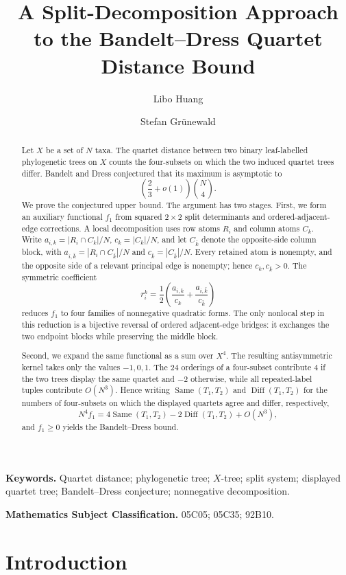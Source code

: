 \documentclass[11pt]{article}
\title{A Split-Decomposition Approach to the Bandelt--Dress Quartet Distance Bound}
\author{Libo Huang \and Stefan Gr\"unewald}
\date{}
\newcommand{\Same}{\operatorname{Same}}
\newcommand{\Diff}{\operatorname{Diff}}
\begin{document}
\maketitle


\begin{abstract}
Let $X$ be a set of $N$ taxa.  The quartet distance between two binary
leaf-labelled phylogenetic trees on $X$ counts the four-subsets on which the
two induced quartet trees differ.  Bandelt and Dress conjectured that its
maximum is asymptotic to
\[
\left(\frac23+o(1)\right)\binom N4.
\]
We prove the conjectured upper bound.  The argument has two stages.  First,
we form an auxiliary functional $f_1$ from squared $2\times2$ split
determinants and ordered-adjacent-edge corrections.  A local decomposition
uses row atoms $R_i$ and column atoms $C_k$.  Write
$a_{i,k}=|R_i\cap C_k|/N$, $c_k=|C_k|/N$, and let $C_{\bar k}$ denote the
opposite-side column block, with
$a_{i,\bar k}=|R_i\cap C_{\bar k}|/N$ and
$c_{\bar k}=|C_{\bar k}|/N$.  Every retained atom is nonempty, and the
opposite side of a relevant principal edge is nonempty; hence
$c_k,c_{\bar k}>0$.  The symmetric coefficient
\[
r_i^k=\frac12\left(\frac{a_{i,k}}{c_k}+\frac{a_{i,\bar k}}{c_{\bar k}}\right)
\]
reduces $f_1$ to four families of nonnegative quadratic forms.  The only
nonlocal step in this reduction is a bijective reversal of ordered
adjacent-edge bridges:
it exchanges the two endpoint blocks while preserving the middle block.

Second, we expand the same functional as a sum over $X^4$.  The resulting
antisymmetric kernel takes only the values $-1,0,1$.  The $24$ orderings of
a four-subset contribute $4$ if the two trees display the same quartet and
$-2$ otherwise, while all repeated-label tuples contribute $O(N^3)$.  Hence
writing $\Same(T_1,T_2)$ and $\Diff(T_1,T_2)$ for the numbers of four-subsets
on which the displayed quartets agree and differ, respectively,
\[
N^4f_1=4\Same(T_1,T_2)-2\Diff(T_1,T_2)+O(N^3),
\]
and $f_1\ge0$ yields the Bandelt--Dress bound.
\end{abstract}

\noindent\textbf{Keywords.} Quartet distance; phylogenetic tree; $X$-tree; split system; displayed quartet tree; Bandelt--Dress conjecture; nonnegative decomposition.

\noindent\textbf{Mathematics Subject Classification.} 05C05; 05C35; 92B10.

\section{Introduction}
\end{document}
